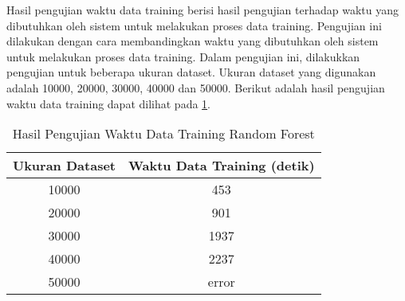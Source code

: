 Hasil pengujian waktu data training berisi hasil pengujian terhadap waktu yang dibutuhkan oleh sistem untuk melakukan proses data training. Pengujian ini dilakukan dengan cara membandingkan waktu yang dibutuhkan oleh sistem untuk melakukan proses data training.
Dalam pengujian ini, dilakukkan pengujian untuk beberapa ukuran dataset. Ukuran dataset yang digunakan adalah 10000, 20000, 30000, 40000 dan 50000. 
Berikut adalah hasil pengujian waktu data training dapat dilihat pada \ref*{table:waktu_rf}.

\begin{table}[H]
    \caption{Hasil Pengujian Waktu Data Training Random Forest}
    \centering
    \begin{tabular}{|c|c|}
    \hline
    \textbf{Ukuran Dataset} & \textbf{Waktu Data Training (detik)} \\
    \hline
    10000 & 453 \\
    \hline
    20000 & 901 \\
    \hline
    30000 & 1937 \\
    \hline
    40000 & 2237 \\
    \hline
    50000 & error \\
    \hline
    \end{tabular}
    \label{table:waktu_rf}
\end{table}